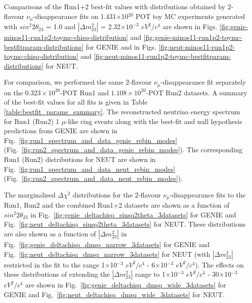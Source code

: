 Comparisons of the Run1+2 best-fit values with distributions obtained by
2-flavour $\nu_{\mu}$-disappearance 
fits on 1.431$\times$10$^{20}$ POT toy MC experiments 
generated with $sin^{2}2\theta_{23}$ = 1.0 and 
$|\Delta m^{2}_{23}|$ = 2.32$\times10^{-3}$ $eV^{2}/c^{4}$ are shown 
in Figs. \ref{fig:genie-minos11-run1p2-toymc-chisq-distribution} and 
\ref{fig:genie-minos11-run1p2-toymc-bestfitparam-distributions} for GENIE and
in Figs. \ref{fig:neut-minos11-run1p2-toymc-chisq-distribution} and 
\ref{fig:neut-minos11-run1p2-toymc-bestfitparam-distributions} for NEUT.

For comparison, we performed the same 2-flavour $\nu_{\mu}$-disappearance fit separately on the 
$0.323\times10^{20}$-POT Run1 and $1.108\times10^{20}$-POT Run2 datasets.
A summary of the best-fit values for all fits is given in Table \ref{table:bestfit_params_summary}.
The reconstructed neutrino energy spectrum for Run1 (Run2) 1 $\mu$-like ring events 
along with the best-fit and null hypothesis predictions from GENIE are shown in 
Fig.\ \ref{fig:run1_spectrum_and_data_genie_rebin_modes} (Fig.\ \ref{fig:run2_spectrum_and_data_genie_rebin_modes}).
The corresponding Run1 (Run2) distributions for NEUT are shown in
Fig.\ \ref{fig:run1_spectrum_and_data_neut_rebin_modes} (Fig.\ \ref{fig:run2_spectrum_and_data_neut_rebin_modes}).

The marginalised $\Delta\chi^{2}$ distributions for the 2-flavour
$\nu_{\mu}$-disappearance fits to the Run1, Run2 and the combined Run1+2 datasets are shown 
as a function of $sin^{2}2\theta_{23}$ in
Fig.\ \ref{fig:genie_deltachisq_sinsq2theta_3datasets} for GENIE and 
Fig.\ \ref{fig:neut_deltachisq_sinsq2theta_3datasets} for NEUT.
These distributions are also shown as a function of $|\Delta m^{2}_{23}|$ in 
Fig.\ \ref{fig:genie_deltachisq_dmsq_narrow_3datasets} for GENIE and
Fig.\ \ref{fig:neut_deltachisq_dmsq_narrow_3datasets} for NEUT 
(with $|\Delta m^{2}_{23}|$ restricted in the fit to the range
1$\times$10$^{-3}$ $eV^{2}/c^{4}$ - 6$\times$10$^{-3}$ $eV^{2}/c^{4}$).
The effects on these distributions of extending the $|\Delta m^{2}_{23}|$ range to
1$\times$10$^{-3}$ $eV^{2}/c^{4}$ - 30$\times$10$^{-3}$ $eV^{2}/c^{4}$ are
shown in
Fig.\ \ref{fig:genie_deltachisq_dmsq_wide_3datasets} for GENIE and
Fig.\ \ref{fig:neut_deltachisq_dmsq_wide_3datasets} for NEUT.

%
%

